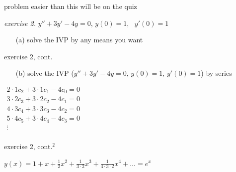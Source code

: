\documentclass[urlcolor=blue,dvipsnames]{beamer}
\begin{document}
\begin{frame}{problem easier than this will be on the quiz}

\noindent \emph{exercise 2.}  \qquad $y''+3y'-4y=0$, \quad $y(0)=1$, \, $y'(0)=1$

\begin{itemize}
\item[(a)] solve the IVP by any means you want
\end{itemize}

\vspace{50mm}
\end{frame}


\begin{frame}{exercise 2, cont.}

\begin{itemize}
\item[(b)] solve the IVP (\small $y''+3y'-4y=0$, $y(0)=1$, $y'(0)=1$\normalsize) by series
\end{itemize}

\vspace{45mm}

\hfill \footnotesize $\displaystyle \boxed{\begin{matrix} 2\cdot 1 c_2 + 3 \cdot 1 c_1 - 4 c_0 = 0 \\
                                     3\cdot 2 c_3 + 3 \cdot 2 c_2 - 4 c_1 = 0 \\
                                     4\cdot 3 c_4 + 3 \cdot 3 c_3 - 4 c_2 = 0 \\
                                     5\cdot 4 c_5 + 3 \cdot 4 c_4 - 4 c_3 = 0 \\
                                      \vdots \\
                      \end{matrix}}$
\end{frame}


\begin{frame}{exercise 2, cont.$^2$}

\vspace{60mm}

\footnotesize
\hfill $y(x) = 1 + x + \frac{1}{2} x^2 + \frac{1}{3\cdot 2} x^3 + \frac{1}{4\cdot 3\cdot 2} x^4 + \dots = e^x$
\end{frame}
\end{document}
